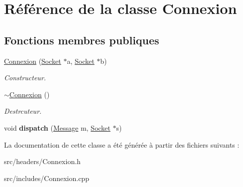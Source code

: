 \hypertarget{classConnexion}{\section{Référence de la classe Connexion}
\label{classConnexion}
}
\subsection*{Fonctions membres publiques}
\begin{DoxyCompactItemize}
\item 
\hypertarget{classConnexion_a31fda5acfafb5ec2de7ae76cfce373a7}{\hyperlink{classConnexion_a31fda5acfafb5ec2de7ae76cfce373a7}{Connexion} (\hyperlink{classSocket}{Socket} $\ast$a, \hyperlink{classSocket}{Socket} $\ast$b)}\label{classConnexion_a31fda5acfafb5ec2de7ae76cfce373a7}

\begin{DoxyCompactList}\small\item\em Constructeur. \end{DoxyCompactList}\item 
\hypertarget{classConnexion_a6afee761c33e160c2be5e9e2713968e3}{\hyperlink{classConnexion_a6afee761c33e160c2be5e9e2713968e3}{$\sim$\-Connexion} ()}\label{classConnexion_a6afee761c33e160c2be5e9e2713968e3}

\begin{DoxyCompactList}\small\item\em Destrcuteur. \end{DoxyCompactList}\item 
\hypertarget{classConnexion_ad2705670b0a7be05ff09ba1294f57200}{void {\bfseries dispatch} (\hyperlink{classMessage}{Message} m, \hyperlink{classSocket}{Socket} $\ast$s)}\label{classConnexion_ad2705670b0a7be05ff09ba1294f57200}

\end{DoxyCompactItemize}


La documentation de cette classe a été générée à partir des fichiers suivants \-:\begin{DoxyCompactItemize}
\item 
src/headers/Connexion.\-h\item 
src/includes/Connexion.\-cpp\end{DoxyCompactItemize}
